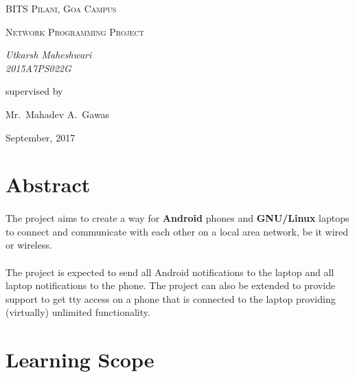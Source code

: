 \documentclass[12pt, letterpaper, titlepage]{article}
\begin{document}
\begin{titlepage}
	\centering
	{\scshape\LARGE BITS Pilani, Goa Campus \par}
	\vspace{1cm}
	{\scshape\Large Network Programming Project\par}
	\vspace{2cm}
	{\large\textit{Utkarsh Maheshwari\\2015A7PS022G}}

	\vfill
	supervised by\par
	Mr.~Mahadev A.~Gawas
	\vfill

    {\large September, 2017}
\end{titlepage}

\tableofcontents
\newpage


\section{Abstract}

    \paragraph{}
    The project aims to create a way for \textbf{Android} phones and
    \textbf{GNU/Linux} laptops to connect and communicate with each other on a
    local area network, be it wired or wireless.

    \paragraph{}
    The project is expected to send all Android notifications to the laptop and
    all laptop notifications to the phone. The project can also be extended to
    provide support to get tty access on a phone that is connected to the
    laptop providing (virtually) unlimited functionality.


\section{Learning Scope}
\end{document}
